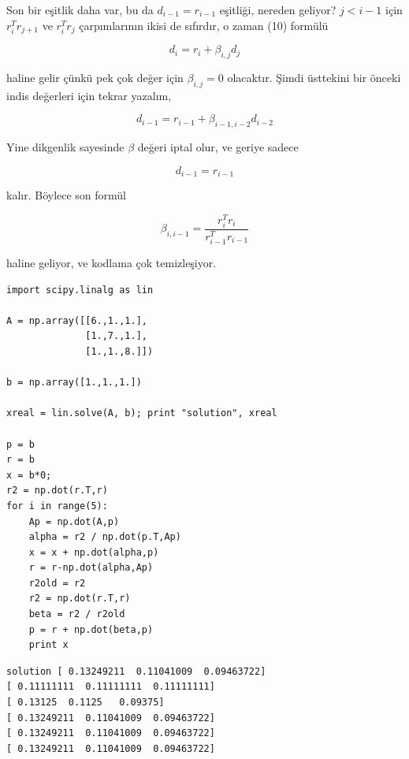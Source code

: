 \documentclass[12pt,fleqn]{article}\usepackage{../../common}
\begin{document}
Son bir eşitlik daha var, bu da $d_{i-1} = r_{i-1}$ eşitliği, nereden
geliyor?  $j < i-1$ için $r_i^Tr_{j+1}$ ve $r_i^Tr_{j}$ çarpımlarının ikisi
de sıfırdır, o zaman (10) formülü

$$ d_i = r_i + \beta_{i,j}d_j $$

haline gelir çünkü pek çok değer için $\beta_{i,j} = 0$ olacaktır. Şimdi
üsttekini bir önceki indis değerleri için tekrar yazalım,

$$ d_{i-1} = r_{i-1} + \beta_{i-1,i-2}d_{i-2} $$

Yine dikgenlik sayesinde $\beta$ değeri iptal olur, ve geriye sadece 

$$ d_{i-1} = r_{i-1} $$

kalır. Böylece son formül

$$  \beta_{i,i-1} = 
\frac{  r_i^Tr_i  }{r_{i-1}^Tr_{i-1}}
$$ 

haline geliyor, ve kodlama çok temizleşiyor. 

\begin{verbatim}
import scipy.linalg as lin

A = np.array([[6.,1.,1.],
              [1.,7.,1.],
              [1.,1.,8.]])

b = np.array([1.,1.,1.])

xreal = lin.solve(A, b); print "solution", xreal

p = b
r = b
x = b*0;
r2 = np.dot(r.T,r)
for i in range(5):
    Ap = np.dot(A,p)
    alpha = r2 / np.dot(p.T,Ap)
    x = x + np.dot(alpha,p)
    r = r-np.dot(alpha,Ap)
    r2old = r2
    r2 = np.dot(r.T,r)
    beta = r2 / r2old
    p = r + np.dot(beta,p)
    print x             
\end{verbatim}

\begin{verbatim}
solution [ 0.13249211  0.11041009  0.09463722]
[ 0.11111111  0.11111111  0.11111111]
[ 0.13125  0.1125   0.09375]
[ 0.13249211  0.11041009  0.09463722]
[ 0.13249211  0.11041009  0.09463722]
[ 0.13249211  0.11041009  0.09463722]
\end{verbatim}
\end{document}
